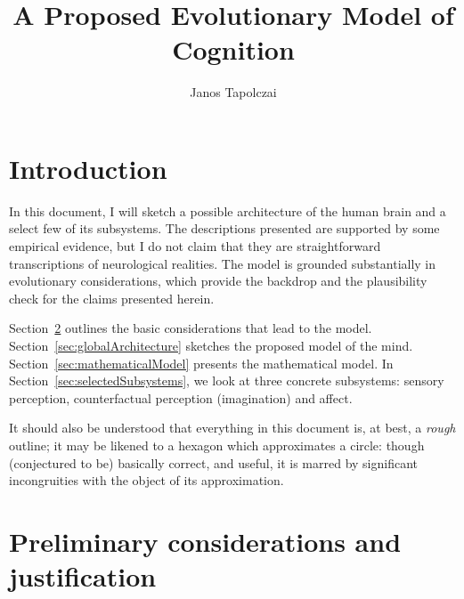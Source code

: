 \documentclass[]{scrartcl}
\title{{\huge A Proposed Evolutionary Model of Cognition}}
\author{Janos Tapolczai}
\theoremstyle{break}
\begin{document}
\maketitle


\begin{abstract}

\end{abstract}

\tableofcontents
\newpage

\section{Introduction}

In this document, I will sketch a possible architecture of the human brain and a select few of its subsystems. The descriptions presented are supported by some empirical evidence, but I do not claim that they are straightforward transcriptions of neurological realities. The model is grounded substantially in evolutionary considerations, which provide the backdrop and the plausibility check for the claims presented herein.

Section~\ref{sec:preliminaries} outlines the basic considerations that lead to the model. Section~\ref{sec:globalArchitecture} sketches the proposed model of the mind. Section~\ref{sec:mathematicalModel} presents the mathematical model. In Section~\ref{sec:selectedSubsystems}, we look at three concrete subsystems: sensory perception, counterfactual perception (imagination) and affect.

It should also be understood that everything in this document is, at best, a {\em rough} outline; it may be likened to a hexagon which approximates a circle: though (conjectured to be) basically correct, and useful, it is marred by significant incongruities with the object of its approximation.

\section{Preliminary considerations and justification}\label{sec:preliminaries}
\end{document}
